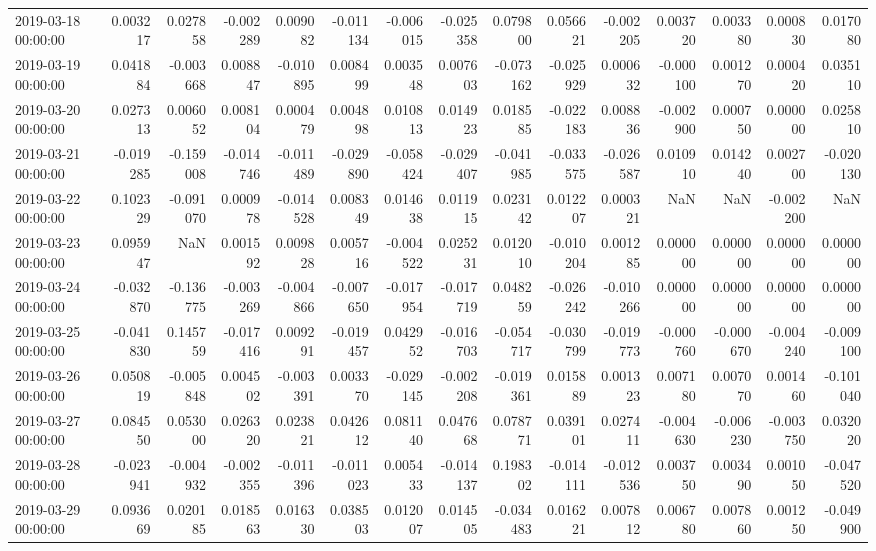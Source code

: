 \begin{tabular}{lrrrrrrrrrrrrrr}
2019-03-18 00:00:00 & 0.003217 & 0.027858 & -0.002289 & 0.009082 & -0.011134 & -0.006015 & -0.025358 & 0.079800 & 0.056621 & -0.002205 & 0.003720 & 0.003380 & 0.000830 & 0.017080 \\
2019-03-19 00:00:00 & 0.041884 & -0.003668 & 0.008847 & -0.010895 & 0.008499 & 0.003548 & 0.007603 & -0.073162 & -0.025929 & 0.000632 & -0.000100 & 0.001270 & 0.000420 & 0.035110 \\
2019-03-20 00:00:00 & 0.027313 & 0.006052 & 0.008104 & 0.000479 & 0.004898 & 0.010813 & 0.014923 & 0.018585 & -0.022183 & 0.008836 & -0.002900 & 0.000750 & 0.000000 & 0.025810 \\
2019-03-21 00:00:00 & -0.019285 & -0.159008 & -0.014746 & -0.011489 & -0.029890 & -0.058424 & -0.029407 & -0.041985 & -0.033575 & -0.026587 & 0.010910 & 0.014240 & 0.002700 & -0.020130 \\
2019-03-22 00:00:00 & 0.102329 & -0.091070 & 0.000978 & -0.014528 & 0.008349 & 0.014638 & 0.011915 & 0.023142 & 0.012207 & 0.000321 & NaN & NaN & -0.002200 & NaN \\
2019-03-23 00:00:00 & 0.095947 & NaN & 0.001592 & 0.009828 & 0.005716 & -0.004522 & 0.025231 & 0.012010 & -0.010204 & 0.001285 & 0.000000 & 0.000000 & 0.000000 & 0.000000 \\
2019-03-24 00:00:00 & -0.032870 & -0.136775 & -0.003269 & -0.004866 & -0.007650 & -0.017954 & -0.017719 & 0.048259 & -0.026242 & -0.010266 & 0.000000 & 0.000000 & 0.000000 & 0.000000 \\
2019-03-25 00:00:00 & -0.041830 & 0.145759 & -0.017416 & 0.009291 & -0.019457 & 0.042952 & -0.016703 & -0.054717 & -0.030799 & -0.019773 & -0.000760 & -0.000670 & -0.004240 & -0.009100 \\
2019-03-26 00:00:00 & 0.050819 & -0.005848 & 0.004502 & -0.003391 & 0.003370 & -0.029145 & -0.002208 & -0.019361 & 0.015889 & 0.001323 & 0.007180 & 0.007070 & 0.001460 & -0.101040 \\
2019-03-27 00:00:00 & 0.084550 & 0.053000 & 0.026320 & 0.023821 & 0.042612 & 0.081140 & 0.047668 & 0.078771 & 0.039101 & 0.027411 & -0.004630 & -0.006230 & -0.003750 & 0.032020 \\
2019-03-28 00:00:00 & -0.023941 & -0.004932 & -0.002355 & -0.011396 & -0.011023 & 0.005433 & -0.014137 & 0.198302 & -0.014111 & -0.012536 & 0.003750 & 0.003490 & 0.001050 & -0.047520 \\
2019-03-29 00:00:00 & 0.093669 & 0.020185 & 0.018563 & 0.016330 & 0.038503 & 0.012007 & 0.014505 & -0.034483 & 0.016221 & 0.007812 & 0.006780 & 0.007860 & 0.001250 & -0.049900 \\

\end{tabular}
